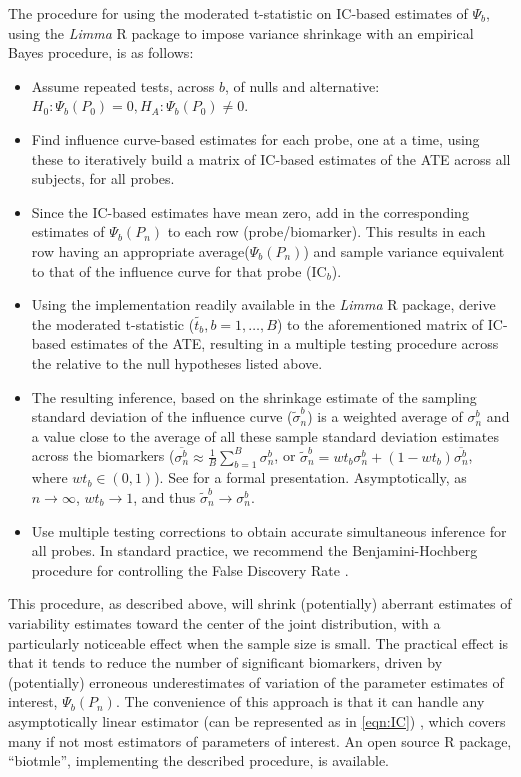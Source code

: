 The procedure for using the moderated t-statistic on IC-based estimates of
$\Psi_b$, using the {\em Limma} R package to impose variance shrinkage with an
empirical Bayes procedure, is as follows:
\begin{itemize}
\item Assume repeated tests, across $b$, of nulls and alternative: $H_0: \Psi_b(P_0) = 0, H_A: \Psi_b(P_0) \ne 0 $.
\item Find influence curve-based estimates for each probe, one at a time,
       using these to iteratively build a matrix of IC-based estimates of the
       ATE across all subjects, for all probes.
\item  Since the IC-based estimates have mean zero, add in the corresponding
       estimates of $\Psi_b(P_n)$ to each row (probe/biomarker). This results
       in each row having an appropriate average($\Psi_b(P_n)$) and sample variance
       equivalent to that of the influence curve for that probe ($\text{IC}_b$).
\item  Using the implementation readily available in the {\em Limma} R package,
       derive the moderated t-statistic ($ \tilde{t_b}, b = 1, \dots, B $) to
       the aforementioned matrix of IC-based estimates of the ATE, resulting in a multiple testing procedure across the
       relative to the null hypotheses listed above.
       \item  The resulting inference, based on the  shrinkage estimate of the
       sampling standard deviation of the influence curve ($\tilde{\sigma}^b_n$)
       is a weighted average of $\sigma^b_n$ and a value close to the average
       of all these sample standard deviation estimates across the biomarkers
       ($\overline{\sigma^b_n} \approx \frac{1}{B} \sum_{b = 1}^B \sigma^b_n$,
       or $\widetilde{\sigma}^b_n = wt_b \sigma^b_n+(1 -
       wt_b)\overline{\sigma^b_n}$, where $wt_b \in (0, 1)$). See
       \cite{smyth2005limma} for a formal presentation. Asymptotically, as $n
       \rightarrow \infty$, $wt_b \rightarrow 1$, and thus
       $\widetilde{\sigma}^b_n \rightarrow  \sigma^b_n$.
  \item Use multiple testing corrections to obtain accurate simultaneous
        inference for all probes. In standard practice, we recommend the
        Benjamini-Hochberg procedure for controlling the False Discovery Rate
        \cite{benjamini1995controlling}.
\end{itemize}

This procedure, as described above, will shrink (potentially) aberrant
estimates of variability estimates toward the center of the joint distribution,
with a particularly noticeable effect when the sample size is small. The
practical effect is that it tends to reduce the number of significant
biomarkers, driven by (potentially) erroneous underestimates of variation of
the parameter estimates of interest, $\Psi_b(P_n)$. The convenience of this
approach is that it can handle any asymptotically linear estimator (can be
represented as in \ref{eqn:IC}) , which covers many if not most estimators of
parameters of interest. An open source R package, ``biotmle'',
implementing the described procedure, is available.
